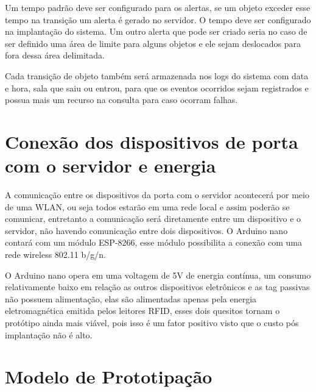 \par
Um tempo padrão deve ser configurado para os alertas, se um objeto exceder esse tempo na transição um alerta é gerado no servidor.
O tempo deve ser configurado na implantação do sistema. Um outro alerta que pode ser criado seria no caso de
ser definido uma área de limite para alguns objetos e ele sejam deslocados para fora dessa área delimitada.

\par
Cada transição de objeto também será armazenada nos logs do sistema com data e hora, sala que saiu ou entrou, para que
os eventos ocorridos sejam registrados e possua mais um recurso na consulta para caso ocorram falhas.


\section{Conexão dos dispositivos de porta com o servidor e energia}
A comunicação entre os dispositivos da porta com o servidor acontecerá por meio de uma WLAN, ou seja todos estarão em uma rede
local e assim poderão se comunicar, entretanto a comunicação será diretamente entre um dispositivo e o servidor,
não havendo comunicação entre dois dispositivos. O Arduino nano contará com um módulo ESP-8266, esse módulo possibilita a
conexão com uma rede wireless 802.11 b/g/n.

\par
O Arduino nano opera em uma voltagem de 5V de energia contínua, um consumo relativamente baixo em relação as outros dispositivos eletrônicos e as tag passivas não possuem alimentação, elas são alimentadas apenas pela energia eletromagnética emitida pelos leitores RFID, esses dois quesitos tornam o protótipo ainda mais viável, pois isso é um fator positivo visto que o custo pós implantação não é alto.


\section{Modelo de Prototipação}

